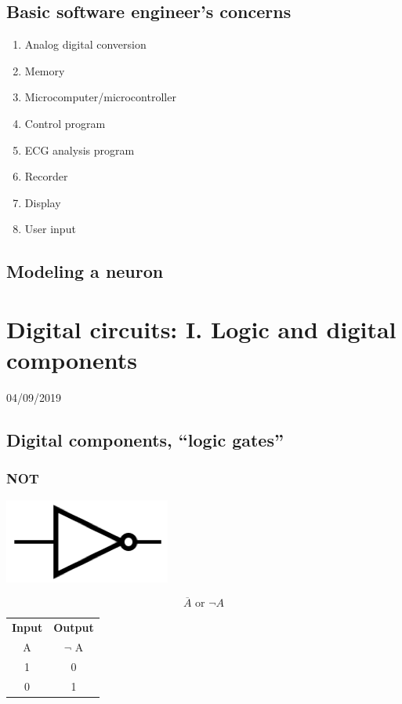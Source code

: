 \documentclass[11pt]{book}
\begin{document}
\section{Basic software engineer's concerns}
\begin{enumerate}
	\item Analog digital conversion
	\item Memory
	\item Microcomputer/microcontroller
	\item Control program
	\item ECG analysis program
	\item Recorder
	\item Display
	\item User input
\end{enumerate}

\section{Modeling a neuron}



\chapter{Digital circuits: I. Logic and digital components}
04/09/2019 
\minitoc
\newpage

\section{Digital components, ``logic gates''}
\subsection{NOT}
\begin{center}
	\includegraphics{figures/20.01.png}
\end{center}
\begin{equation}
	\overline{A} \text{ or } \neg A
\end{equation}
\begin{center}
	\begin{tabular}{c c}
		\textbf{Input} & \textbf{Output} \\
		A & $\neg$ A \\
		1 & 0 \\
		0 & 1\\
	\end{tabular}
\end{center}
\end{document}
